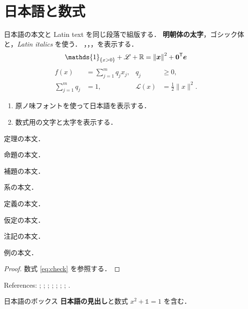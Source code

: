 \section{日本語と数式}\label{sec:check}
日本語の本文と Latin text を同じ段落で組版する．
\textbf{明朝体の太字}，\textsf{ゴシック体}と，\textit{Latin italics} を使う．
，，，を表示する．
\begin{equation}
 \mathds{1}_{\{x>0\}}+\mathscr{L}+\mathbb{R}
 =\left\lVert\bm{x}\right\rVert^2+\bzero^{\mathsf T}\be
 \label{eq:check}
\end{equation}
\begin{align}
 f(x)&=\sum_{j=1}^{m}q_j x_j, &q_j&\ge0,\\
 \sum_{j=1}^{m}q_j&=1, &\mathcal L(x)&=\frac12\lVert x\rVert^2.
\end{align}
\begin{enumerate}[label=(\roman*),leftmargin=*]
 \item 原ノ味フォントを使って日本語を表示する．
 \item 数式用の文字と太字を表示する．
\end{enumerate}
\begin{theorem}\label{thm:check}定理の本文．\end{theorem}
\begin{proposition}\label{prop:check}命題の本文．\end{proposition}
\begin{lemma}\label{lem:check}補題の本文．\end{lemma}
\begin{corollary}\label{cor:check}系の本文．\end{corollary}
\begin{definition}\label{def:check}定義の本文．\end{definition}
\begin{assumption}\label{ass:check}仮定の本文．\end{assumption}
\begin{remark}\label{rem:check}注記の本文．\end{remark}
\begin{example}\label{ex:check}例の本文．\end{example}
\begin{proof}数式 \eqref{eq:check} を参照する．\end{proof}
References: ; ; ;
; ; ; ; .
\begin{generalbox}{日本語のボックス}
\textbf{日本語の見出し}と数式 $x^2+\mathds{1}=1$ を含む．
\tcblower
{}
\end{generalbox}
